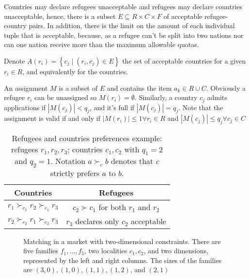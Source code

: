     Countries may declare refugees unacceptable and refugees may declare countries unacceptable, hence, there is a subset \(E \subseteq R \times C \times F\) of acceptable refugee-country pairs.
    In addition, there is the limit on the amount of each individual tuple that is acceptable, because, as a refugee can't be split into two nations nor can one nation receive more than the maximum allowable quotas.
    
    Denote \(A \left( r_i \right) = \left\{ c_j \mid \left( r_i, c_j \right) \in E \right\}\) the set of acceptable countries for a given \(r_i \in R\), and equivalently for the countries.
    
    An assignment \(M\) is a subset of \(E\) and contains the item \(a_k \in R \cup C\).
    Obviously a refugee \(r_i\) can be unassigned so \(M \left( r_i \right) = \emptyset\).
    Similarly, a country \(c_j\) admits applications if \(\left| M \left( c_j \right) \right| < q_j\), and it's full if \(\left| M \left( c_j \right) \right| = q_j\).
    Note that the assignment is valid if and only if \(\left| M \left( r_i \right) \right| \leq 1 \forall r_i \in R\) and \(\left| M \left( c_j \right) \right| \leq q_j \forall c_j \in C\)

    \begin{table}[!htb]
        \begin{tabular}{c|c}
            \hline Countries & Refugees \\
            \hline \(r_1 \succ_{c_1} r_2 \succ_{c_1} r_3\) & \(c_2 \succ c_1\) for both \(r_1\) and \(r_2\) \\
            \(r_2 \succ_{c_2} r_1 \succ_{c_2} r_3\) & \(r_3\) declares only \(c_2\) acceptable \\
            \hline
        \end{tabular}
        \caption{Refugees and countries preferences example: refugees \(r_1, r_2, r_3\); countries \(c_1, c_2\) with \(q_1 = 2\) and \(q_2 = 1\). Notation \(a \succ_c b\) denotes that \(c\) strictly prefers \(a\) to \(b\).}
        \label{tab:countries-refugees}
    \end{table}

    \begin{figure}[!htb] %
        \def\svgwidth{\columnwidth}
        
        \caption{Matching in a market with two-dimensional constraints. There are five families
            \(f_1, \dots, f_5\), two localities \(c_1, c_2\), and two dimensions, represented by the left and right columns.
            The sizes of the families are \((3, 0), (1, 0), (1, 1), (1, 2)\), and \((2, 1)\)}
        \label{fig:complete_matching}
    \end{figure}